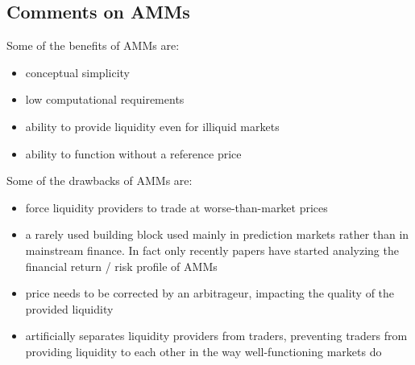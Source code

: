 \documentclass[11pt, reqno]{amsart}
\theoremstyle{definition}
\theoremstyle{remark}
\begin{document}
\subsection{Comments on AMMs}

Some of the benefits of AMMs are:
\begin{itemize}
	\item conceptual simplicity
	\item low computational requirements
	\item ability to provide liquidity even for illiquid markets
	\item ability to function without a reference price
\end{itemize}

Some of the drawbacks of AMMs are:
\begin{itemize}
	\item force liquidity providers to trade at worse-than-market prices
	\item a rarely used building block used mainly in prediction markets rather than
	      in mainstream finance. In fact only recently papers have started analyzing
	      the financial return / risk profile of AMMs \cite{MiMoRoZh22}
	\item price needs to be corrected by an arbitrageur, impacting the quality of
	      the provided liquidity
    \item artificially separates liquidity providers from traders, preventing traders
          from providing liquidity to each other in the way well-functioning
          markets do
\end{itemize}
\end{document}
